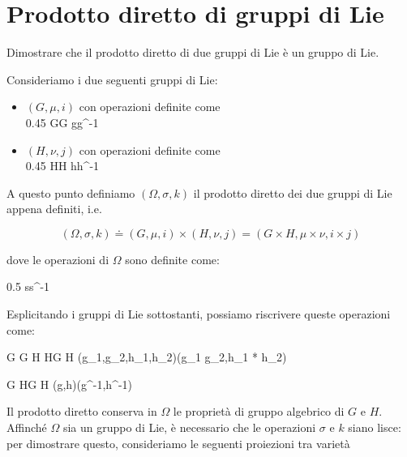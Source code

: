 \section{Prodotto diretto di gruppi di Lie}\label{es3-1}

\begin{tcolorbox}
	Dimostrare che il prodotto diretto di due gruppi di Lie è un gruppo di Lie.
\end{tcolorbox}

Consideriamo i due seguenti gruppi di Lie:

\begin{itemize}
	\item $ (G, \mu, i) $ con operazioni definite come\\
			{0.45}{%
						{G}{G}
						{g}{g^{-1}}
					}
		
	\item $ (H, \nu, j) $ con operazioni definite come\\
			{0.45}{%
						{H}{H}
						{h}{h^{-1}}
					}	
\end{itemize}

A questo punto definiamo $ (\Omega, \sigma, k) $ il prodotto diretto dei due gruppi di Lie appena definiti, i.e.

\begin{equation}
	(\Omega, \sigma, k) \doteq (G, \mu, i) \times (H, \nu, j) = (G \times H, \mu \times \nu, i \times j)
\end{equation}

dove le operazioni di $ \Omega $ sono definite come:

	{0.5}{%
				{\Omega}{\Omega}
				{s}{s^{-1}}
			}

Esplicitando i gruppi di Lie sottostanti, possiamo riscrivere queste operazioni come:

\map{\sigma = \mu \times \nu}
	{G \times G \times H \times H}{G \times H}
	{(g_{1},g_{2},h_{1},h_{2})}{(g_{1} \cdot g_{2},h_{1} * h_{2})}

	{G \times H}{G \times H}
	{(g,h)}{(g^{-1},h^{-1})}

Il prodotto diretto conserva in $ \Omega $ le proprietà di gruppo algebrico di $ G $ e $ H $. Affinché $ \Omega $ sia un gruppo di Lie, è necessario che le operazioni $ \sigma $ e $ k $ siano lisce: per dimostrare questo, consideriamo le seguenti proiezioni tra varietà


